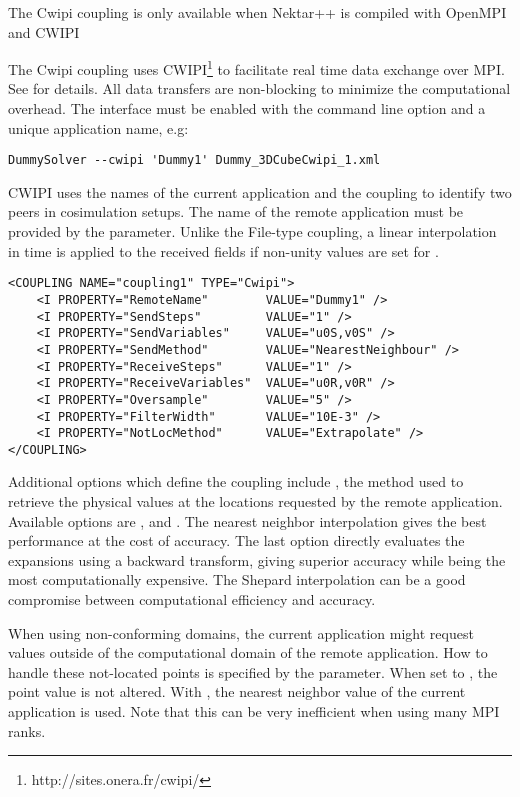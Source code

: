 \begin{notebox}
    The Cwipi coupling is only available when Nektar++ is compiled with OpenMPI and CWIPI
\end{notebox}
The Cwipi coupling uses CWIPI\footnote{http://sites.onera.fr/cwipi/} to facilitate real time data exchange over MPI.
See \cite{LaSaJa17} for details.
All data transfers are non-blocking to minimize the computational overhead.
The interface must be enabled with the command line option  and a unique application name, e.g:\begin{lstlisting}[style=BashInputStyle] 
DummySolver --cwipi 'Dummy1' Dummy_3DCubeCwipi_1.xml
\end{lstlisting}
CWIPI uses the names of the current application and the coupling to identify two peers in cosimulation setups.
The name of the remote application must be provided by the  parameter.
Unlike the File-type coupling, a linear interpolation in time is applied to the received fields if non-unity values are set for .
\begin{lstlisting}[style=XMLStyle] 
<COUPLING NAME="coupling1" TYPE="Cwipi">
    <I PROPERTY="RemoteName"        VALUE="Dummy1" />
    <I PROPERTY="SendSteps"         VALUE="1" />
    <I PROPERTY="SendVariables"     VALUE="u0S,v0S" />
    <I PROPERTY="SendMethod"        VALUE="NearestNeighbour" />
    <I PROPERTY="ReceiveSteps"      VALUE="1" />
    <I PROPERTY="ReceiveVariables"  VALUE="u0R,v0R" />
    <I PROPERTY="Oversample"        VALUE="5" />
    <I PROPERTY="FilterWidth"       VALUE="10E-3" />
    <I PROPERTY="NotLocMethod"      VALUE="Extrapolate" />
</COUPLING>
\end{lstlisting}

Additional options which define the coupling include , the method used to retrieve the physical values at the locations requested by the remote application.
Available options are ,  and . 
The nearest neighbor interpolation gives the best performance at the cost of accuracy. 
The last option directly evaluates the expansions using a backward transform, giving superior accuracy while being the most computationally expensive. 
The Shepard interpolation can be a good compromise between computational efficiency and accuracy.

When using non-conforming domains, the current application might request values outside of the computational domain of the remote application.
How to handle these not-located points is specified by the  parameter.
When set to , the point value is not altered.
With , the nearest neighbor value of the current application is used.
Note that this can be very inefficient when using many MPI ranks.


